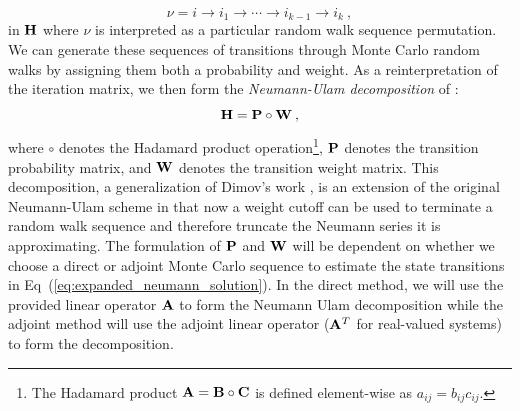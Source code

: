 \begin{equation}
 \nu = i \rightarrow i_1 \rightarrow \cdots \rightarrow i_{k-1}
 \rightarrow i_{k}\:,
  \label{eq:mc_walk_permutation}
\end{equation}
in $\mathbf{H}$ where $\nu$ is interpreted as a particular random walk
sequence permutation. We can generate these sequences of transitions
through Monte Carlo random walks by assigning them both a probability
and weight. As a reinterpretation of the iteration matrix, we then
form the \textit{Neumann-Ulam decomposition} of :
\begin{equation}
  \mathbf{H} = \mathbf{P} \circ \mathbf{W}\:,
  \label{eq:neumann_ulam_decomposition}
\end{equation}
where $\circ$ denotes the Hadamard product operation\footnote{The
  Hadamard product $\mathbf{A} = \mathbf{B} \circ \mathbf{C}$ is defined
  element-wise as $a_{ij} = b_{ij} c_{ij}$.}, $\mathbf{P}$ denotes the
transition probability matrix, and $\mathbf{W}$ denotes the transition
weight matrix. This decomposition, a generalization of Dimov's work
\citep{dimov_new_1998}, is an extension of the original Neumann-Ulam
scheme in that now a weight cutoff can be used to terminate a random
walk sequence and therefore truncate the Neumann series it is
approximating. The formulation of $\mathbf{P}$ and $\mathbf{W}$ will be
dependent on whether we choose a direct or adjoint Monte Carlo
sequence to estimate the state transitions in
Eq~(\ref{eq:expanded_neumann_solution}). In the direct method, we will
use the provided linear operator $\mathbf{A}$ to form the Neumann Ulam
decomposition while the adjoint method will use the adjoint linear
operator ($\mathbf{A}^T$ for real-valued systems) to form the
decomposition.


